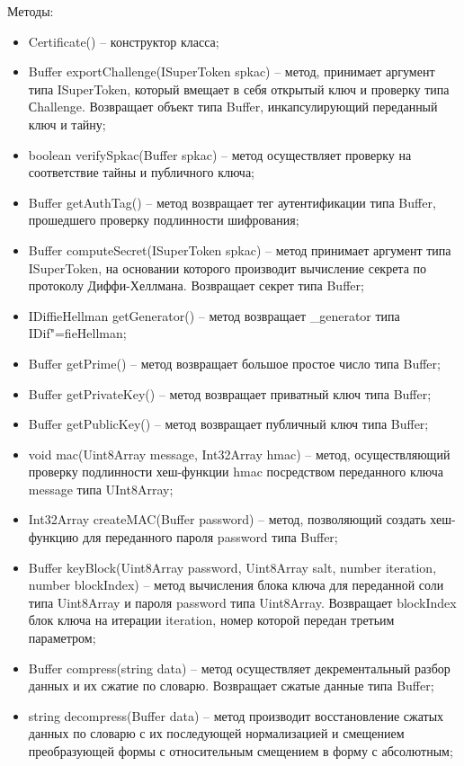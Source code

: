 Методы:
\begin{itemize}
  \item Certificate() – конструктор класса;
  \item Buffer exportChallenge(ISuperToken spkac) – метод, принимает аргумент типа ISuperToken, который вмещает в себя открытый ключ и проверку типа Сhallenge. Возвращает объект типа Buffer, инкапсулирующий переданный ключ и тайну;
  \item boolean verifySpkac(Buffer spkac) – метод осуществляет проверку на соответствие тайны и публичного ключа;
  \item Buffer getAuthTag() – метод возвращает тег аутентификации типа Buffer, прошедшего проверку подлинности шифрования;
  \item Buffer computeSecret(ISuperToken spkac) – метод принимает аргумент типа ISuperToken, на основании которого производит вычисление секрета по протоколу Диффи-Хеллмана. Возвращает секрет типа Buffer;
  \item IDiffieHellman getGenerator() – метод возвращает \_generator типа  IDif"=fieHellman;
  \item Buffer getPrime() – метод возвращает большое простое число типа Buffer;
  \item Buffer getPrivateKey() – метод возвращает приватный ключ типа Buffer;
  \item Buffer getPublicKey() – метод возвращает публичный ключ типа Buffer;
  \item void mac(Uint8Array message, Int32Array hmac) – метод, осуществляющий проверку подлинности хеш-функции hmac посредством переданного ключа message типа UInt8Array;
  \item Int32Array createMAC(Buffer password) – метод, позволяющий создать хеш-функцию для переданного пароля password типа Buffer;
  \item Buffer keyBlock(Uint8Array password, Uint8Array salt, number iteration, number blockIndex) – метод вычисления блока ключа для переданной соли типа Uint8Array и пароля password типа Uint8Array. Возвращает blockIndex блок ключа на итерации iteration, номер которой передан третьим параметром;
  \item Buffer compress(string data) – метод осуществляет декрементальный разбор данных и их сжатие по словарю. Возвращает сжатые данные типа Buffer;
  \item string decompress(Buffer data) – метод производит восстановление сжатых данных по словарю с их последующей нормализацией и смещением преобразующей формы с относительным смещением в форму с абсолютным;

\end{itemize}
